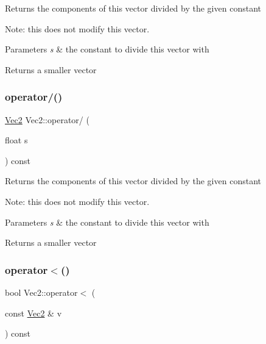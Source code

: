 Returns the components of this vector divided by the given constant

Note\+: this does not modify this vector.


\begin{DoxyParams}{Parameters}
{\em s} & the constant to divide this vector with \\
\hline
\end{DoxyParams}
\begin{DoxyReturn}{Returns}
a smaller vector 
\end{DoxyReturn}
\mbox{\label{classVec2_a30794ad88645e3d0279e8253e4355e8d}} 
\subsubsection{\texorpdfstring{operator/()}{operator/()}\hspace{0.1cm}{\footnotesize\ttfamily [2/2]}}
{\footnotesize\ttfamily \hyperlink{classVec2}{Vec2} Vec2\+::operator/ (\begin{DoxyParamCaption}\item[{float}]{s }\end{DoxyParamCaption}) const\hspace{0.3cm}{\ttfamily [inline]}}

Returns the components of this vector divided by the given constant

Note\+: this does not modify this vector.


\begin{DoxyParams}{Parameters}
{\em s} & the constant to divide this vector with \\
\hline
\end{DoxyParams}
\begin{DoxyReturn}{Returns}
a smaller vector 
\end{DoxyReturn}
\mbox{\label{classVec2_aad24b95fb51746343f06c504a7a05681}} 
\subsubsection{\texorpdfstring{operator$<$()}{operator<()}\hspace{0.1cm}{\footnotesize\ttfamily [1/2]}}
{\footnotesize\ttfamily bool Vec2\+::operator$<$ (\begin{DoxyParamCaption}\item[{const \hyperlink{classVec2}{Vec2} \&}]{v }\end{DoxyParamCaption}) const\hspace{0.3cm}{\ttfamily [inline]}}

